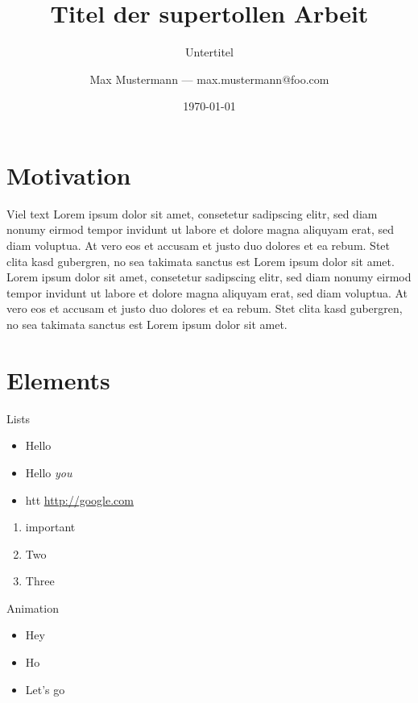 \documentclass[compress]{beamer}
\title{Titel der supertollen Arbeit}
\subtitle{Untertitel}
\date{\today}
\author{Max Mustermann --- max.mustermann@foo.com}
\institute{Institut für so und so\\Universtität Bla}
\begin{document}
\maketitle


\section{Motivation}

\begin{frame}{Viel text}
Lorem ipsum dolor sit amet, consetetur sadipscing elitr, sed diam nonumy eirmod
tempor invidunt ut labore et dolore magna aliquyam erat, sed diam voluptua. At
vero eos et accusam et justo duo dolores et ea rebum. Stet clita kasd gubergren,
no sea takimata sanctus est Lorem ipsum dolor sit amet. Lorem ipsum dolor sit
amet, consetetur sadipscing elitr, sed diam nonumy eirmod tempor invidunt ut
labore et dolore magna aliquyam erat, sed diam voluptua. At vero eos et accusam
et justo duo dolores et ea rebum. Stet clita kasd gubergren, no sea takimata
sanctus est Lorem ipsum dolor sit amet.
\end{frame}


\section{Elements}

\begin{frame}{Lists}
  \begin{itemize}
    \item Hello
    \item Hello \emph{you}
    \item htt \url{http://google.com}
  \end{itemize}

  \begin{enumerate}
    \item \alert{important}
    \item Two
    \item Three
  \end{enumerate}
\end{frame}

\begin{frame}{Animation}
  \begin{itemize}[<+- | alert@+>]
    \item Hey
    \item \alert<4>{Ho}
    \item Let's go
  \end{itemize}
\end{frame}
\end{document}
